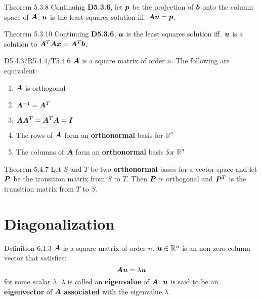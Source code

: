 \documentclass[10pt,portrait]{article}
\begin{document}
\begin{multicols}{2}
\begin{justifying}
\begin{namedthm*}{Theorem 5.3.8}
	Continuing \textbf{D5.3.6}, let \(\bm{p}\) be the projection of \(\bm{b}\) onto the column space of \(\bm{A}\). \(\bm{u}\) is the least squares solution iff. \(\bm{A}\bm{u} = \bm{p}\).
\end{namedthm*}

\begin{namedthm*}{Theorem 5.3.10}
	Continuing \textbf{D5.3.6}, \(\bm{u}\) is the least squares solution iff. \(\bm{u}\) is a solution to \(\bm{A}^T\bm{A}\bm{x} = \bm{A}^T\bm{b}\).
\end{namedthm*}

\begin{namedthm*}{D5.4.3/R5.4.4/T5.4.6}
	\(\bm{A}\) is a square matrix of order \(n\). The following are equivalent:
	\begin{enumerate}
		\item \(\bm{A}\) is orthogonal
		\item \(\bm{A}^{-1} = \bm{A}^T\)
		\item \(\bm{A}\bm{A}^T = \bm{A}^T\bm{A} = \bm{I}\)
		\item The rows of \(\bm{A}\) form an \textbf{orthonormal} basis for \(\mathbb{R}^n\)
		\item The columns of \(\bm{A}\) form an \textbf{orthonormal} basis for \(\mathbb{R}^n\)
	\end{enumerate}
\end{namedthm*}

\begin{namedthm*}{Theorem 5.4.7}
	Let \(S\) and \(T\) be two \textbf{orthonormal} bases for a vector space and let \(\bm{P}\) be the transition matrix from \(S\) to \(T\). Then \(\bm{P}\) is orthogonal and \(\bm{P}^T\) is the transition matrix from \(T\) to \(S\).
\end{namedthm*}

\section{Diagonalization}

\begin{namedthm*}{Definition 6.1.3}
	\(\bm{A}\) is a square matrix of order \(n\). \(\bm{u} \in \mathbb{R}^n\) is an non-zero column vector that satisfies:
	\[
	    \bm{A}\bm{u} = \lambda \bm{u}
	\]
	for some scalar \(\lambda\). \(\lambda\) is called an \textbf{eigenvalue} of \(\bm{A}\). \(\bm{u}\) is said to be an \textbf{eigenvector} of \(\bm{A}\) \textbf{associated} with the eigenvalue \(\lambda\).
\end{namedthm*}


\end{justifying}
\end{multicols}
\end{document}
